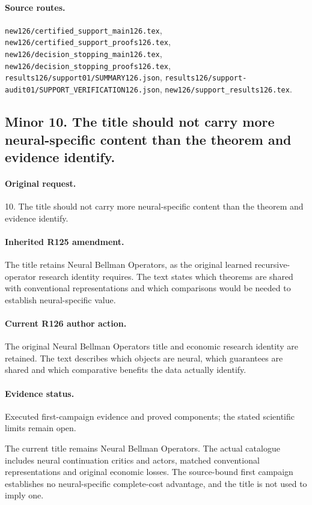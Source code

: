 \paragraph{Source routes.} \nolinkurl{new126/certified_support_main126.tex}, \nolinkurl{new126/certified_support_proofs126.tex}, \nolinkurl{new126/decision_stopping_main126.tex}, \nolinkurl{new126/decision_stopping_proofs126.tex}, \nolinkurl{results126/support01/SUMMARY126.json}, \nolinkurl{results126/support-audit01/SUPPORT_VERIFICATION126.json}, \nolinkurl{new126/support_results126.tex}.

\subsection*{Minor 10. The title should not carry more neural-specific content than the theorem and evidence identify.}
\paragraph{Original request.} 10. The title should not carry more neural-specific content than the theorem and evidence identify.

\paragraph{Inherited R125 amendment.} The title retains Neural Bellman Operators, as the original learned recursive-operator research identity requires. The text states which theorems are shared with conventional representations and which comparisons would be needed to establish neural-specific value.

\paragraph{Current R126 author action.} The original Neural Bellman Operators title and economic research identity are retained. The text describes which objects are neural, which guarantees are shared and which comparative benefits the data actually identify.

\paragraph{Evidence status.} Executed first-campaign evidence and proved components; the stated scientific limits remain open.

The current title remains Neural Bellman Operators. The actual catalogue includes neural continuation critics and actors, matched conventional representations and original economic losses. The source-bound first campaign establishes no neural-specific complete-cost advantage, and the title is not used to imply one.\par

